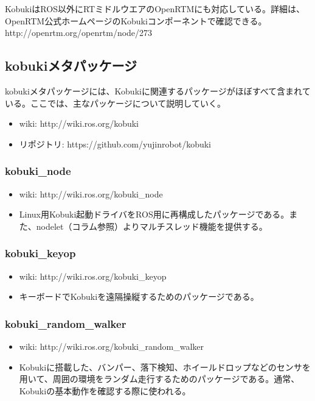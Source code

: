 \begin{exercise}[OpenRTMサポートソフトウェア]
KobukiはROS以外にRTミドルウエアのOpenRTMにも対応している。詳細は、OpenRTM公式ホームページのKobukiコンポーネントで確認できる。
http://openrtm.org/openrtm/node/273
\end{exercise}

\subsection{kobukiメタパッケージ}

kobukiメタパッケージには、Kobukiに関連するパッケージがほぼすべて含まれている。ここでは、主なパッケージについて説明していく。

\begin{itemize}
\item wiki: http://wiki.ros.org/kobuki
\item リポジトリ: https://github.com/yujinrobot/kobuki
\end{itemize}

\subsubsection{kobuki\_node}

\begin{itemize}
\item wiki: http://wiki.ros.org/kobuki\_node
\item Linux用Kobuki起動ドライバをROS用に再構成したパッケージである。また、nodelet（コラム参照）よりマルチスレッド機能を提供する。
\end{itemize}

\subsubsection{kobuki\_keyop}

\begin{itemize}
\item wiki: http://wiki.ros.org/kobuki\_keyop
\item キーボードでKobukiを遠隔操縦するためのパッケージである。
\end{itemize}

\subsubsection{kobuki\_random\_walker}

\begin{itemize}
\item wiki: http://wiki.ros.org/kobuki\_random\_walker
\item Kobukiに搭載した、バンパー、落下検知、ホイールドロップなどのセンサを用いて、周囲の環境をランダム走行するためのパッケージである。通常、Kobukiの基本動作を確認する際に使われる。
\end{itemize}

